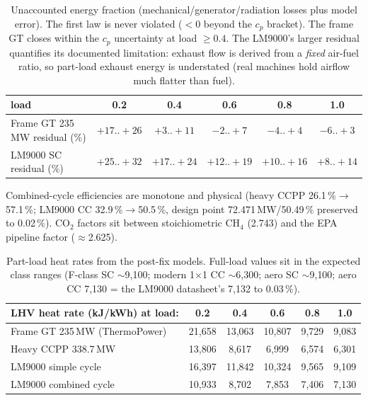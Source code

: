 \documentclass[11pt]{article}
\begin{document}
\begin{table}[h]\centering
\small
\begin{tabular}{lccccc}
\toprule
load & 0.2 & 0.4 & 0.6 & 0.8 & 1.0 \\
\midrule
Frame GT 235\,MW residual (\%) & $+17..{+}26$ & $+3..{+}11$ & $-2..{+}7$ & $-4..{+}4$ & $-6..{+}3$ \\
LM9000 SC residual (\%) & $+25..{+}32$ & $+17..{+}24$ & $+12..{+}19$ & $+10..{+}16$ & $+8..{+}14$ \\
\bottomrule
\end{tabular}
\caption{Unaccounted energy fraction (mechanical/generator/radiation
losses plus model error). The first law is never violated ($<0$ beyond
the $c_p$ bracket). The frame GT closes within the $c_p$ uncertainty at
load $\ge 0.4$. The LM9000's larger residual quantifies its documented
limitation: exhaust flow is derived from a \emph{fixed} air-fuel ratio, so
part-load exhaust energy is understated (real machines hold airflow much
flatter than fuel).}
\end{table}

Combined-cycle efficiencies are monotone and physical (heavy CCPP
26.1\,\%$\to$57.1\,\%; LM9000 CC 32.9\,\%$\to$50.5\,\%, design point
72.471\,MW/50.49\,\% preserved to 0.02\,\%). CO$_2$ factors sit between
stoichiometric CH$_4$ (2.743) and the EPA pipeline factor
($\approx$2.625).

\begin{table}[h]\centering
\small
\begin{tabular}{lccccc}
\toprule
LHV heat rate (kJ/kWh) at load: & 0.2 & 0.4 & 0.6 & 0.8 & 1.0 \\
\midrule
Frame GT 235\,MW (ThermoPower) & 21{,}658 & 13{,}063 & 10{,}807 & 9{,}729 & 9{,}083 \\
Heavy CCPP 338.7\,MW          & 13{,}806 &  8{,}617 &  6{,}999 & 6{,}574 & 6{,}301 \\
LM9000 simple cycle           & 16{,}397 & 11{,}842 & 10{,}324 & 9{,}565 & 9{,}109 \\
LM9000 combined cycle         & 10{,}933 &  8{,}702 &  7{,}853 & 7{,}406 & 7{,}130 \\
\bottomrule
\end{tabular}
\caption{Part-load heat rates from the post-fix models. Full-load values
sit in the expected class ranges (F-class SC $\sim$9{,}100; modern 1$\times$1
CC $\sim$6{,}300; aero SC $\sim$9{,}100; aero CC 7{,}130 = the LM9000
datasheet's 7{,}132 to 0.03\,\%).}
\end{table}
\end{document}
